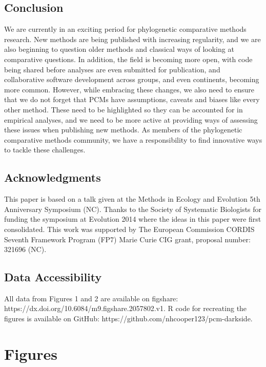 \documentclass[a4paper,12pt]{article}
\begin{document}
  \subsection{Conclusion}
    We are currently in an exciting period for phylogenetic comparative methods research.
    New methods are being published with increasing regularity, and we are also beginning to question older methods and classical ways of looking at comparative questions. 
    In addition, the field is becoming more open, with code being shared before analyses are even submitted for publication, and collaborative software development across groups, and even continents, becoming more common.
    However, while embracing these changes, we also need to ensure that we do not forget that PCMs have assumptions, caveats and biases like every other method. 
    These need to be highlighted so they can be accounted for in empirical analyses, and we need to be more active at providing ways of assessing these issues when publishing new methods.
    As members of the phylogenetic comparative methods community, we have a responsibility to find innovative ways to tackle these challenges. 

  \subsection{Acknowledgments}
    This paper is based on a talk given at the Methods in Ecology and Evolution 5th Anniversary Symposium (NC).
    Thanks to the Society of Systematic Biologists for funding the symposium at Evolution 2014 where the ideas in this paper were first consolidated. 
    This work was supported by The European Commission CORDIS Seventh Framework Program (FP7) Marie Curie CIG grant, proposal number: 321696 (NC).

  \subsection{Data Accessibility}
    All data from Figures 1 and 2 are available on figshare: https://dx.doi.org/10.6084/m9.figshare.2057802.v1. R code for recreating the figures is available on GitHub: https://github.com/nhcooper123/pcm-darkside.




\newpage
\section{Figures}
\end{document}
